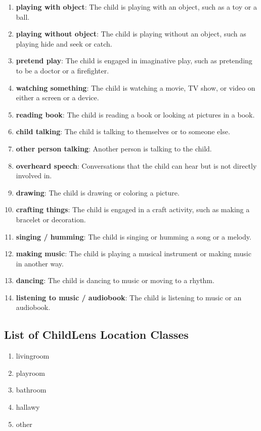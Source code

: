 \documentclass[
  man,floatsintext]{apa6}
\providecommand{\tightlist}{%
  \setlength{\itemsep}{0pt}\setlength{\parskip}{0pt}}
\begin{document}
\begin{enumerate}
\def\labelenumi{\arabic{enumi}.}
\tightlist
\item
  \textbf{playing with object}: The child is playing with an object, such as a toy or a ball.
\item
  \textbf{playing without object}: The child is playing without an object, such as playing hide and seek or catch.
\item
  \textbf{pretend play}: The child is engaged in imaginative play, such as pretending to be a doctor or a firefighter.
\item
  \textbf{watching something}: The child is watching a movie, TV show, or video on either a screen or a device.
\item
  \textbf{reading book}: The child is reading a book or looking at pictures in a book.
\item
  \textbf{child talking}: The child is talking to themselves or to someone else.
\item
  \textbf{other person talking}: Another person is talking to the child.
\item
  \textbf{overheard speech}: Conversations that the child can hear but is not directly involved in.
\item
  \textbf{drawing}: The child is drawing or coloring a picture.
\item
  \textbf{crafting things}: The child is engaged in a craft activity, such as making a bracelet or decoration.
\item
  \textbf{singing / humming}: The child is singing or humming a song or a melody.
\item
  \textbf{making music}: The child is playing a musical instrument or making music in another way.
\item
  \textbf{dancing}: The child is dancing to music or moving to a rhythm.
\item
  \textbf{listening to music / audiobook}: The child is listening to music or an audiobook.
\end{enumerate}

\subsection{List of ChildLens Location Classes}\label{list-of-childlens-location-classes}

\begin{enumerate}
\def\labelenumi{\arabic{enumi}.}
\tightlist
\item
  livingroom
\item
  playroom
\item
  bathroom
\item
  hallawy
\item
  other
\end{enumerate}
\end{document}
